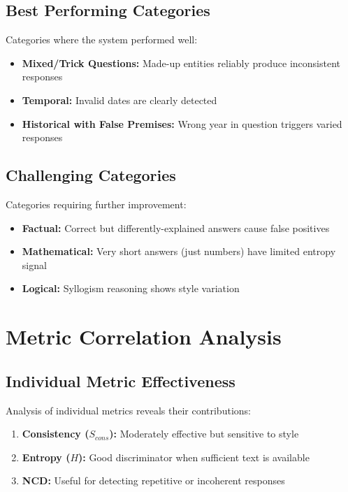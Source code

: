 \subsection{Best Performing Categories}

Categories where the system performed well:
\begin{itemize}
    \item \textbf{Mixed/Trick Questions:} Made-up entities reliably produce inconsistent responses
    \item \textbf{Temporal:} Invalid dates are clearly detected
    \item \textbf{Historical with False Premises:} Wrong year in question triggers varied responses
\end{itemize}

\subsection{Challenging Categories}

Categories requiring further improvement:
\begin{itemize}
    \item \textbf{Factual:} Correct but differently-explained answers cause false positives
    \item \textbf{Mathematical:} Very short answers (just numbers) have limited entropy signal
    \item \textbf{Logical:} Syllogism reasoning shows style variation
\end{itemize}

\section{Metric Correlation Analysis}

\subsection{Individual Metric Effectiveness}

Analysis of individual metrics reveals their contributions:

\begin{enumerate}
    \item \textbf{Consistency ($S_{cons}$):} Moderately effective but sensitive to style
    \item \textbf{Entropy ($H$):} Good discriminator when sufficient text is available
    \item \textbf{NCD:} Useful for detecting repetitive or incoherent responses
\end{enumerate}

